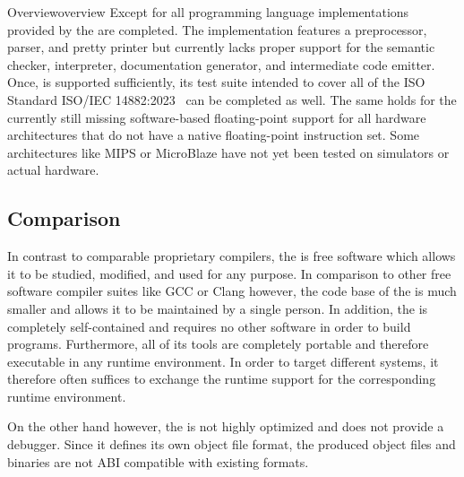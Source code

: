 \begin{presentation}{Overview}{overview}
Except for \cpp{} all programming language implementations provided by the \ecs{} are completed.
The \cpp{} implementation features a preprocessor, parser, and pretty printer but currently lacks proper support for the semantic checker, interpreter, documentation generator, and intermediate code emitter.
Once, \cpp{} is supported sufficiently, its test suite intended to cover all of the ISO \cpp{} Standard ISO/IEC 14882:2023~\cite{iso2023} can be completed as well.
The same holds for the currently still missing software-based floating-point support for all hardware architectures that do not have a native floating-point instruction set.
Some architectures like MIPS or MicroBlaze have not yet been tested on simulators or actual hardware.


\subsection{Comparison}

In contrast to comparable proprietary compilers, the \ecs{} is free software which allows it to be studied, modified, and used for any purpose.
In comparison to other free software compiler suites like GCC or Clang however, the code base of the \ecs{} is much smaller and allows it to be maintained by a single person.
In addition, the \ecs{} is completely self-contained and requires no other software in order to build programs.
Furthermore, all of its tools are completely portable and therefore executable in any runtime environment.
In order to target different systems, it therefore often suffices to exchange the runtime support for the corresponding runtime environment.


On the other hand however, the \ecs{} is not highly optimized and does not provide a debugger.
Since it defines its own object file format, the produced object files and binaries are not ABI compatible with existing formats.

\end{presentation}


